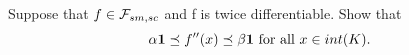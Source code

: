 \begin{exercise}[]{}
	Suppose that $ f \in \mathcal{F}_{sm,sc} $ and f is twice differentiable. Show that 
\begin{equation*}
	\alpha \mathbf{1}\preceq f''(x) \preceq \beta \mathbf{1} \text{ for all $ x\in int(K). $} 
\end{equation*}

\end{exercise}

\begin{solution}[TODO]
\end{solution}
